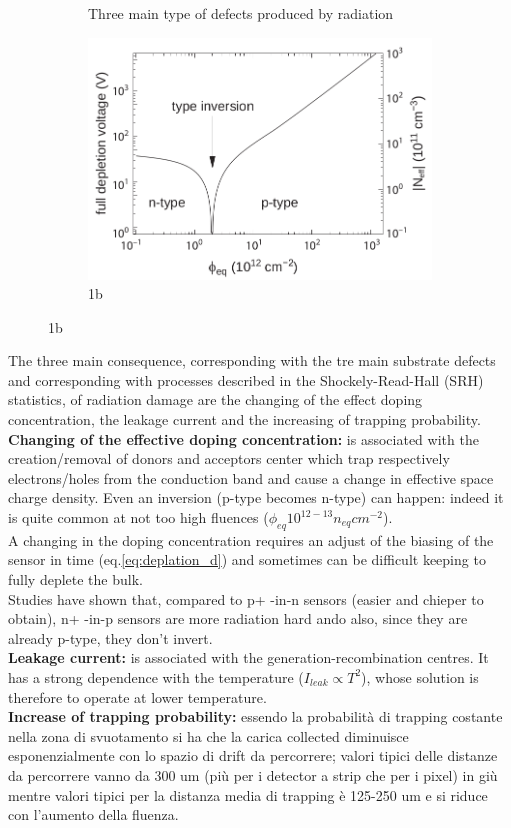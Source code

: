 \begin{titlepage}
\begin{figure}
\begin{subfigure}{.5\textwidth}
     \caption{Three main type of defects produced by radiation}
     \label{fig:radiation_damage_scheme}
   \end{subfigure}%
   \begin{subfigure}{.5\textwidth}
     \centering
     \includegraphics[width=.8\linewidth]{figures/type_inversion.png}
     \caption{1b}
     \label{fig:type_inversion}
   \end{subfigure}
\end{figure}
The three main consequence, corresponding with the tre main substrate defects and corresponding with processes described in the Shockely-Read-Hall (SRH) statistics, of radiation damage are the changing of the effect doping concentration, the leakage current and the increasing of trapping probability.\\
\textbf{Changing of the effective doping concentration:} is associated with the creation/removal of donors and acceptors center which trap respectively electrons/holes from the conduction band and cause a change in effective space charge density. Even an inversion (p-type becomes n-type) can happen: indeed it is quite common at not too high fluences ($\phi_{eq} 10^{12-13}n_{eq}cm^{-2}$). \\
A changing in the doping concentration requires an adjust of the biasing of the sensor in time (eq.\ref{eq:deplation_d}) and sometimes can be difficult keeping to fully deplete the bulk.\\
Studies have shown that, compared to p+ -in-n sensors (easier and chieper to obtain), n+ -in-p sensors are more radiation hard ando also, since they are already p-type, they don't invert.\\
\textbf{Leakage current:} is associated with the generation-recombination centres. It has a strong dependence with the temperature ($I_{leak}\propto T^2$), whose solution is therefore to operate at lower temperature.\\
\textbf{Increase of trapping probability:}
essendo la probabilità di trapping costante nella zona di svuotamento si ha che la carica collected diminuisce esponenzialmente con lo spazio di drift da percorrere; valori tipici delle distanze da percorrere vanno da 300 um (più per i detector a strip che per i pixel) in giù mentre valori tipici per la distanza media di trapping è 125-250 um e si riduce con l'aumento della fluenza.\\ 


\end{titlepage}
